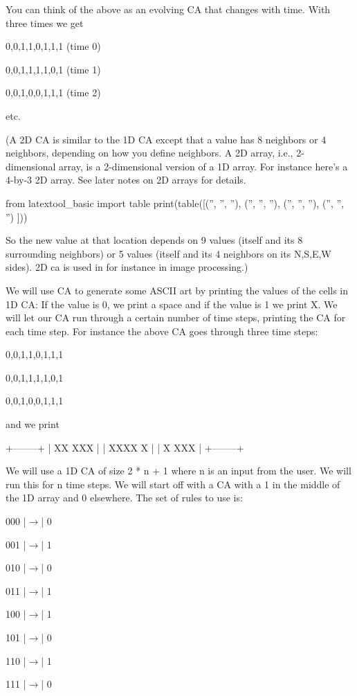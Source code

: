You can think of the above as an evolving CA that changes with time. With three times we get

\begin{console}
0,0,1,1,0,1,1,1 (time 0)

0,0,1,1,1,1,0,1 (time 1)

0,0,1,0,0,1,1,1 (time 2)
\end{console}

etc.

(A 2D CA is similar to the 1D CA except that a value has 8 neighbors or 4 neighbors, depending on how you define neighbors. A 2D array, i.e., 2-dimensional array, is a 2-dimensional version of a 1D array. For instance here's a 4-by-3 2D array. See later notes on 2D arrays for details.
\begin{python}
from latextool_basic import table
print(table([('', '', ''),
('', '', ''),
('', '', ''),
('', '', '')
]))
\end{python}
So the new value at that location depends on 9 values (itself and its 8 surrounding neighbors) or 5 values (itself and its 4 neighbors on its N,S,E,W sides). 2D ca is used in for instance in image processing.)

We will use CA to generate some ASCII art by printing the values of the cells in 1D CA: If the value is 0, we print a space and if the value is 1 we print X. We will let our CA run through a certain number of time steps, printing the CA for each time step. For instance the above CA goes through three time steps:

\begin{console}
0,0,1,1,0,1,1,1

0,0,1,1,1,1,0,1

0,0,1,0,0,1,1,1
\end{console}

and we print

\begin{console}
+--------+
| XX XXX |
| XXXX X |
| X XXX  |
+--------+
\end{console}

We will use a 1D CA of size 2 * n + 1 where n is an input from the user. We will run this for n time steps. We will start off with a CA with a 1 in the middle of the 1D array and 0 elsewhere. The set of rules to use is:

\begin{consolethree}[escapeinside=||]
000 |$\rightarrow$| 0

001 |$\rightarrow$| 1

010 |$\rightarrow$| 0

011 |$\rightarrow$| 1

100 |$\rightarrow$| 1

101 |$\rightarrow$| 0

110 |$\rightarrow$| 1

111 |$\rightarrow$| 0
\end{consolethree}

